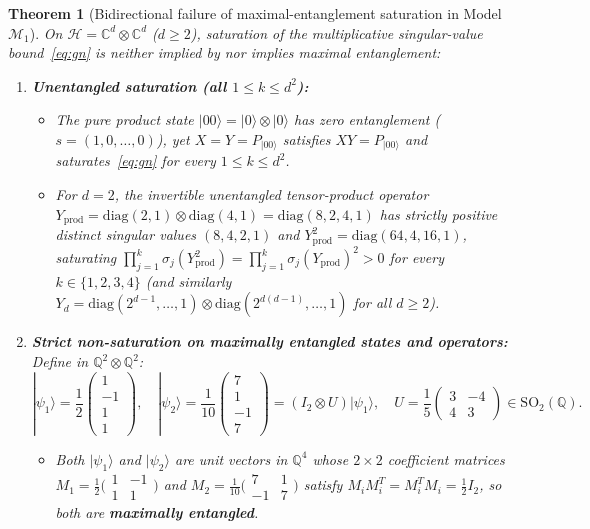 \documentclass[11pt,a4paper]{article}
\theoremstyle{plain}
\newtheorem{theorem}{Theorem}[section]
\theoremstyle{definition}
\newcommand{\C}{\mathbb{C}}
\newcommand{\Q}{\mathbb{Q}}
\newcommand{\cH}{\mathcal{H}}
\newcommand{\diag}{\mathrm{diag}}
\newcommand{\SO}{\mathrm{SO}}
\begin{document}
\begin{theorem}[Bidirectional failure of maximal-entanglement saturation in Model $\mathcal{M}_1$]
\label{thm:m1_refute}
On $\cH = \C^d \otimes \C^d$ ($d \ge 2$), saturation of the multiplicative singular-value bound~\eqref{eq:gn} is neither implied by nor implies maximal entanglement:
\begin{enumerate}
  \item \textbf{Unentangled saturation (all $1 \le k \le d^2$):}
    \begin{itemize}
      \item The pure product state $|00\rangle = |0\rangle \otimes |0\rangle$ has zero entanglement ($s = (1,0,\dots,0)$), yet $X = Y = P_{|00\rangle}$ satisfies $XY = P_{|00\rangle}$ and saturates~\eqref{eq:gn} for every $1 \le k \le d^2$.
      \item For $d = 2$, the invertible unentangled tensor-product operator $Y_{\mathrm{prod}} = \diag(2,1) \otimes \diag(4,1) = \diag(8,2,4,1)$ has strictly positive distinct singular values $(8,4,2,1)$ and $Y_{\mathrm{prod}}^2 = \diag(64,4,16,1)$, saturating $\prod_{j=1}^k \sigma_j(Y_{\mathrm{prod}}^2) = \prod_{j=1}^k \sigma_j(Y_{\mathrm{prod}})^2 > 0$ for every $k \in \{1,2,3,4\}$ (and similarly $Y_d = \diag(2^{d-1},\dots,1) \otimes \diag(2^{d(d-1)},\dots,1)$ for all $d \ge 2$).
    \end{itemize}
  \item \textbf{Strict non-saturation on maximally entangled states and operators:} Define in $\Q^2 \otimes \Q^2$:
    \[
      |\psi_1\rangle = \frac{1}{2}\begin{pmatrix} 1 \\ -1 \\ 1 \\ 1 \end{pmatrix}, \quad
      |\psi_2\rangle = \frac{1}{10}\begin{pmatrix} 7 \\ 1 \\ -1 \\ 7 \end{pmatrix} = (I_2 \otimes U)|\psi_1\rangle, \quad
      U = \frac{1}{5}\begin{pmatrix} 3 & -4 \\ 4 & 3 \end{pmatrix} \in \SO_2(\Q).
    \]
    \begin{itemize}
      \item Both $|\psi_1\rangle$ and $|\psi_2\rangle$ are unit vectors in $\Q^4$ whose $2 \times 2$ coefficient matrices $M_1 = \frac{1}{2}\bigl(\begin{smallmatrix}1 & -1\\ 1 & 1\end{smallmatrix}\bigr)$ and $M_2 = \frac{1}{10}\bigl(\begin{smallmatrix}7 & 1\\ -1 & 7\end{smallmatrix}\bigr)$ satisfy $M_i M_i^T = M_i^T M_i = \frac{1}{2} I_2$, so both are \textbf{maximally entangled}.

\end{itemize}
\end{enumerate}
\end{theorem}
\end{document}
